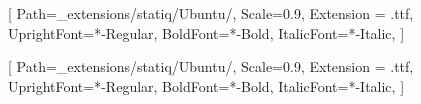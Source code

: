 \makeatletter
\renewcommand{\maketitle}{
  \begin{titlepage}
    \vspace*{2cm}
    \begin{flushleft}
      {\sffamily\Huge\textbf{\MakeUppercase{\@title}}} \\
      \vspace{0.5cm}
      {\sffamily\Large \@subtitle} \\
      \vspace{1cm}
      {\sffamily\large \@author}
    \end{flushleft}
    \vfill
    \begin{flushleft}
      {\sffamily\large \@date}
    \end{flushleft}
  \end{titlepage}
}
\makeatother



\setsansfont{Ubuntu}[
    Path=_extensions/statiq/Ubuntu/,
    Scale=0.9,
    Extension = .ttf,
    UprightFont=*-Regular,
    BoldFont=*-Bold,
    ItalicFont=*-Italic,
    ]

\setmainfont{Ubuntu}[
    Path=_extensions/statiq/Ubuntu/,
    Scale=0.9,
    Extension = .ttf,
    UprightFont=*-Regular,
    BoldFont=*-Bold,
    ItalicFont=*-Italic,
    ]